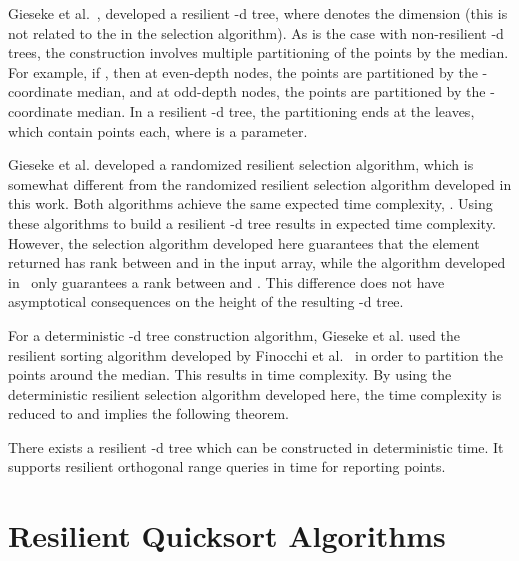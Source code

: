 \documentclass{llncs}
\begin{document}
Gieseke et al.~\cite{kd_trees}, developed a resilient -d tree, where  denotes the dimension (this  is not related to the  in the selection algorithm). As is the case with non-resilient -d trees,
the construction involves multiple partitioning of the points by the median.
For example, if , then at even-depth nodes, the points are partitioned by the -coordinate median,
and at odd-depth nodes, the points are partitioned by the -coordinate median.
In a resilient -d tree, the partitioning ends at the leaves, which contain  points each,
where  is a parameter.

Gieseke et al. developed a randomized resilient selection algorithm, which is somewhat different
from the randomized resilient selection algorithm developed in this work.
Both algorithms achieve the same expected time complexity, .
Using these algorithms to build a resilient -d tree results in  expected time complexity.
However, the selection algorithm developed here guarantees that the element returned has rank
between  and  in the input array,
while the algorithm developed in~\cite{kd_trees} only guarantees a rank between  and .
This difference does not have asymptotical consequences on the height of the resulting -d tree.

For a deterministic -d tree construction algorithm, Gieseke et al. used the resilient sorting algorithm
developed by Finocchi et al.~\cite{resilient_sorting} in order to partition the points around the median.
This results in  time complexity.
By using the deterministic resilient selection algorithm developed here,
the time complexity is reduced to  and implies the following theorem.

\begin{theorem}\label{theorem:kd_trees}
There exists a resilient -d tree which can be constructed in deterministic  time.
It supports resilient orthogonal range queries in  time for reporting  points.
\end{theorem}















\section{Resilient Quicksort Algorithms}
\label{sec:resilient_quicksort_algorithms}
\end{document}
